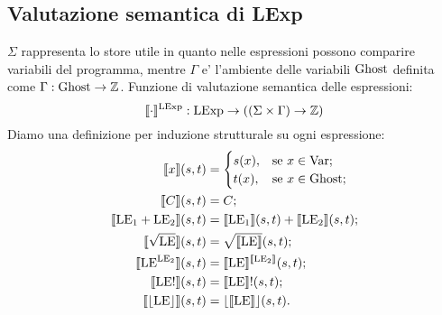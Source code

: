 \subsection{Valutazione semantica di LExp}
$\Sigma$ rappresenta lo store utile in quanto nelle espressioni possono comparire variabili del programma, mentre $\Gamma$ e' l'ambiente delle variabili $\mathrm{Ghost}$ definita come $\Gamma\mathrel{:}\mathrm{Ghost}\rightarrow\mathbb{Z}$. Funzione di valutazione semantica delle espressioni:
\[
\llbracket\cdot\rrbracket ^{\mathrm{LExp}}: \mathrm{LExp} \rightarrow ((\Sigma \times \Gamma) \rightarrow \mathbb{Z})
\]
Diamo una definizione per induzione strutturale su ogni espressione:
\begin{align*}
   \llbracket x \rrbracket(s,t) 
      &=
        \begin{cases}
                 s(x), &\text{se $x \in\mathrm{Var}$};\\
                 t(x), &\text{se $ x \in\mathrm{Ghost}$};
        \end{cases}\\
   \llbracket  C\rrbracket(s,t) 
     &=  C;\\
   \llbracket \mathrm{LE}{_1}+\mathrm{LE}{_2} \rrbracket(s,t) 
     &= \llbracket \mathrm{LE}{_1} \rrbracket(s,t) + \llbracket \mathrm{LE}{_2}\rrbracket( s, t);\\
   \llbracket \sqrt{\mathrm{LE}} \rrbracket(s,t) 
     &= \sqrt{\llbracket\mathrm{LE}\rrbracket}(s,t);\\
   \llbracket \mathrm{LE}^{\mathrm{LE}{_2}}\rrbracket(s,t) 
     &= \llbracket\mathrm{LE}\rrbracket^{\llbracket\mathrm{LE}{_2}\rrbracket}(s,t);\\
   \llbracket \mathrm{LE}!\rrbracket(s,t) 
     &= \llbracket\mathrm{LE}\rrbracket!(s,t);\\
   \llbracket \lfloor \mathrm{LE} \rfloor\rrbracket(s,t) 
     &= \lfloor\llbracket \mathrm{LE} \rrbracket\rfloor(s,t).
\end{align*}
